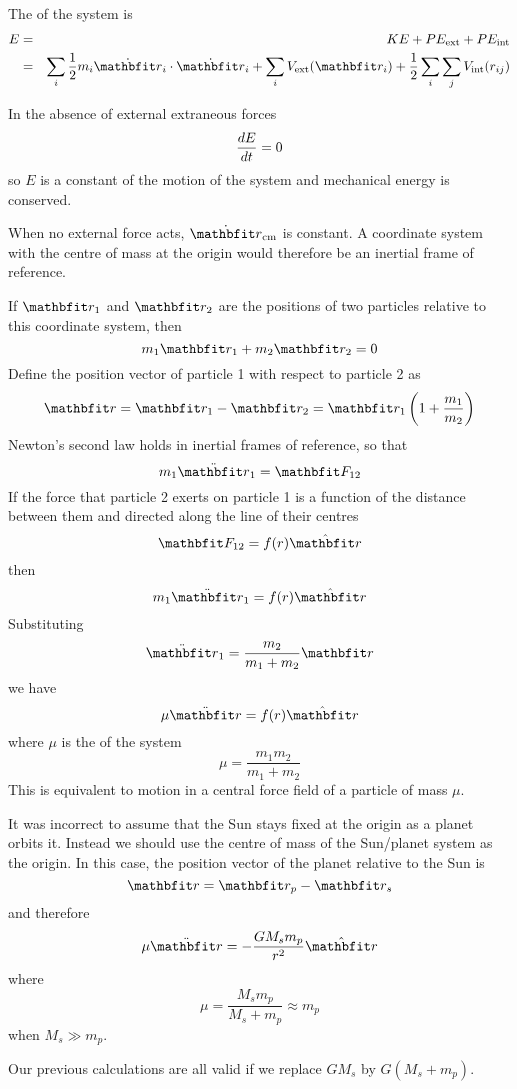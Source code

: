 The  of the system is
\begin{eqnarray*}
E&=&KE+PE_{\rm ext}+PE_{\rm int}\\
&=&\sum_i\frac{1}{2}m_i\dot{\vect{r}}_i\cdot\dot{\vect{r}}_i+
\sum_iV_{\rm ext}(\vect{r}_i)+\frac{1}{2}\sum_i\sum_j V_{\rm int}(r_{ij})
\end{eqnarray*}

\begin{theorem}
In the absence of external extraneous forces
$$\frac{dE}{dt}=0$$
so $E$ is a constant of the motion of the system and mechanical energy is
conserved.
\end{theorem}

\begin{example}
When no external force acts, $\dot{\vect{r}}_{\rm cm}$ is constant.  A
coordinate system with the centre of mass at the origin would therefore be an
inertial frame of reference.

If $\vect{r}_1$ and $\vect{r}_2$ are the positions of two
particles relative to this coordinate system, then
$$m_1\vect{r}_1+m_2\vect{r}_2=0$$
Define the position vector of particle 1 with respect to particle 2 as
$$\vect{r}=\vect{r}_1-\vect{r}_2
=\vect{r}_1\left(1+\frac{m_1}{m_2}\right)$$
Newton's second law holds in inertial frames of reference, so that
$$m_1\ddot{\vect{r}}_1=\vect{F}_{12}$$
If the force that particle 2 exerts on particle 1 is a function of the
distance between them and directed along the line of their centres
$$\vect{F}_{12}=f(r)\rvect$$
then
$$m_1\ddot{\vect{r}}_1=f(r)\rvect$$
Substituting
$$\ddot{\vect{r}}_1=\frac{m_2}{m_1+m_2}\vect{r}$$
we have
$$\mu\ddot{\vect{r}}=f(r)\rvect$$
where $\mu$ is the  of the system
$$\mu=\frac{m_1m_2}{m_1+m_2}$$
This is equivalent to motion in a central force field of a particle of mass
$\mu$.
\end{example}

\begin{example}
It was incorrect to assume that the Sun stays fixed at the origin as a
planet orbits it.  Instead we should use the centre of mass of the
Sun/planet system as the origin.  In this case, the position vector of the
planet relative to the Sun is
$$\vect{r}=\vect{r}_p-\vect{r}_s$$
and therefore
$$\mu\ddot{\vect{r}}=-\frac{GM_sm_p}{r^2}\rvect$$
where
$$\mu=\frac{M_sm_p}{M_s+m_p}\approx m_p$$
when $M_s\gg m_p$.

Our previous calculations are all valid if we replace $GM_s$ by
$G(M_s+m_p)$.
\end{example}

